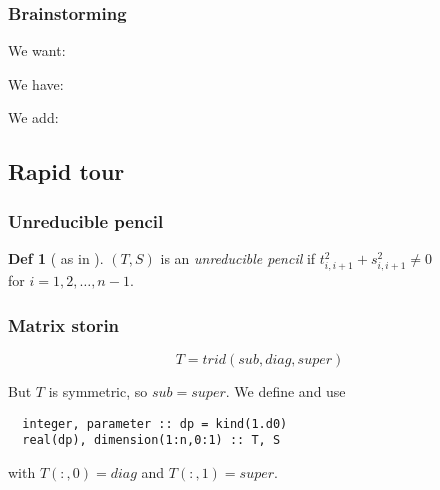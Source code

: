 \documentclass{beamer}
\theoremstyle{definition} \newtheorem{de}{Def}
\theoremstyle{remark} \newtheorem{os}[de]{Oss}
\theoremstyle{plain} \newtheorem{te}[de]{Teo}
\theoremstyle{plain} \newtheorem{co}[de]{Cor}
\theoremstyle{plain} \newtheorem{pr}[de]{Prop}
\theoremstyle{plain} \newtheorem{lem}[de]{Lemm}
\theoremstyle{remark} \newtheorem{rem}[de]{Remark}
\begin{document}
\begin{frame}
\frametitle{Brainstorming}

\begin{Bdescription}
  \item [We want:]
  
  \item [We have:]

  \item [We add:]
\end{Bdescription}
\end{frame}

\subsection{Rapid tour}

\begin{frame}
\frametitle{Unreducible pencil}

\begin{de}[ as in \cite{MR739278} ]
  $(T,S)$ is an \emph{unreducible pencil} if $t_{i,i+1}^2 + s_{i,i+1}^2 \neq 0$\\
  for $i=1,2,\dots,n-1$.
\end{de}
\end{frame}

\begin{frame}[fragile]
\frametitle{Matrix storin}

\begin{equation*}
  T = trid(sub,diag,super)
\end{equation*}

But $T$ is symmetric, so $sub=super$. We define and use

\begin{lstlisting}
  integer, parameter :: dp = kind(1.d0)
  real(dp), dimension(1:n,0:1) :: T, S  
\end{lstlisting}

with $T(:,0)=diag$ and $T(:,1)=super$.

\end{frame}
\end{document}
